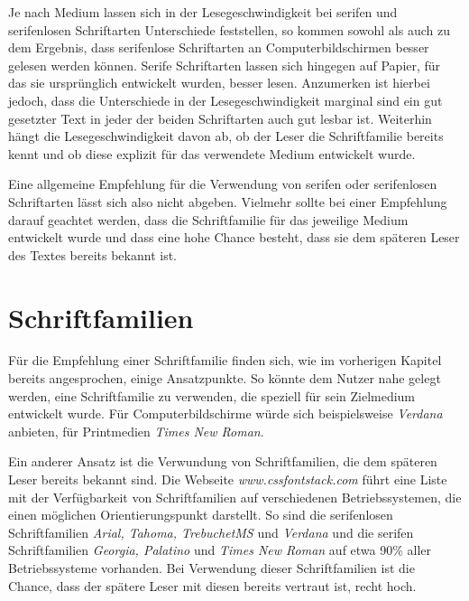 Je nach Medium lassen sich in der Lesegeschwindigkeit bei serifen und serifenlosen Schriftarten Unterschiede feststellen, so kommen sowohl \cite{josephson2008keeping} als auch \cite{dogusoy2016serif} zu dem Ergebnis, dass serifenlose Schriftarten an Computerbildschirmen besser gelesen werden können. Serife Schriftarten lassen sich hingegen auf Papier, für das sie ursprünglich entwickelt wurden, besser lesen.
Anzumerken ist hierbei jedoch, dass die Unterschiede in der Lesegeschwindigkeit marginal sind ein gut gesetzter Text in jeder der beiden Schriftarten auch gut lesbar ist.
Weiterhin hängt die Lesegeschwindigkeit davon ab, ob der Leser die Schriftfamilie bereits kennt und ob diese explizit für das verwendete Medium entwickelt wurde. \cite{josephson2008keeping}

Eine allgemeine Empfehlung für die Verwendung von serifen oder serifenlosen Schriftarten lässt sich also nicht abgeben. Vielmehr sollte bei einer Empfehlung darauf geachtet werden, dass die Schriftfamilie für das jeweilige Medium entwickelt wurde und dass eine hohe Chance besteht, dass sie dem späteren Leser des Textes bereits bekannt ist.



\section{Schriftfamilien}
Für die Empfehlung einer Schriftfamilie finden sich, wie im vorherigen Kapitel bereits angesprochen, einige Ansatzpunkte. 
So könnte dem Nutzer nahe gelegt werden, eine Schriftfamilie zu verwenden, die speziell für sein Zielmedium entwickelt wurde. Für Computerbildschirme würde sich beispielsweise \textit{Verdana} anbieten, für Printmedien \textit{Times New Roman}.

Ein anderer Ansatz ist die Verwundung von Schriftfamilien, die dem späteren Leser bereits bekannt sind. Die Webseite \textit{www.cssfontstack.com} \cite{cssfontstack} führt eine Liste mit der Verfügbarkeit von Schriftfamilien auf verschiedenen Betriebssystemen, die einen möglichen Orientierungspunkt darstellt. So sind die serifenlosen Schriftfamilien \textit{Arial, Tahoma, TrebuchetMS} und \textit{Verdana} und die serifen Schriftfamilien \textit{Georgia, Palatino} und \textit{Times New Roman} auf etwa 90\% aller Betriebssysteme vorhanden.
Bei Verwendung dieser Schriftfamilien ist die Chance, dass der spätere Leser mit diesen bereits vertraut ist, recht hoch.


